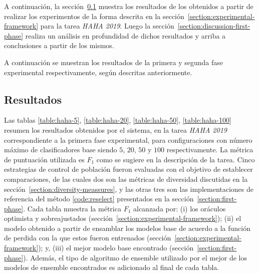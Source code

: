A continuación, la sección~\ref{section:results-first-phase} muestra los resultados de los obtenidos a partir de realizar los experimentos de la forma descrita en la sección~\ref{section:experimental-framework} para la tarea \emph{HAHA 2019}. Luego la sección~\ref{section:discussion-first-phase} realiza un análisis en profundidad de dichos resultados y arriba a conclusiones a partir de los mismos.

A continuación se muestran los resultados de la primera y segunda fase experimental respectivamente, según descritas anteriormente.

\subsection{Resultados}\label{section:results-first-phase}

Las tablas \ref{table:haha-5}, \ref{table:haha-20}, \ref{table:haha-50}, \ref{table:haha-100} resumen los resultados obtenidos por el sistema, en la tarea \emph{HAHA 2019} correspondiente a la primera fase experimental, para configuraciones con número máximo de clasificadores base siendo $5$, $20$, $50$ y $100$ respectivamente.
La métrica de puntuación utilizada es $F_1$ como se sugiere en la descripción de la tarea.
Cinco estrategias de control de población fueron evaluadas con el objetivo de establecer comparaciones, de las cuales dos son las métricas de diversidad discutidas en la sección~\ref{section:diversity-meassures}, y las otras tres son las implementaciones de referencia del método \ref{code:reselect} presentados en la sección~\ref{section:first-phase}.
Cada tabla muestra la métrica $F_1$ alcanzada por:
(i) los oráculos optimista y sobreajustados (sección~\ref{section:experimental-framework});
(ii) el modelo obtenido a partir de ensamblar los modelos base de acuerdo a la función de perdida con la que estos fueron entrenados (sección~\ref{section:experimental-framework}); y,
(iii) el mejor modelo base encontrado (sección~\ref{section:first-phase}).
Además, el tipo de algoritmo de ensemble utilizado por el mejor de los modelos de ensemble encontrados es adicionado al final de cada tabla.


%

